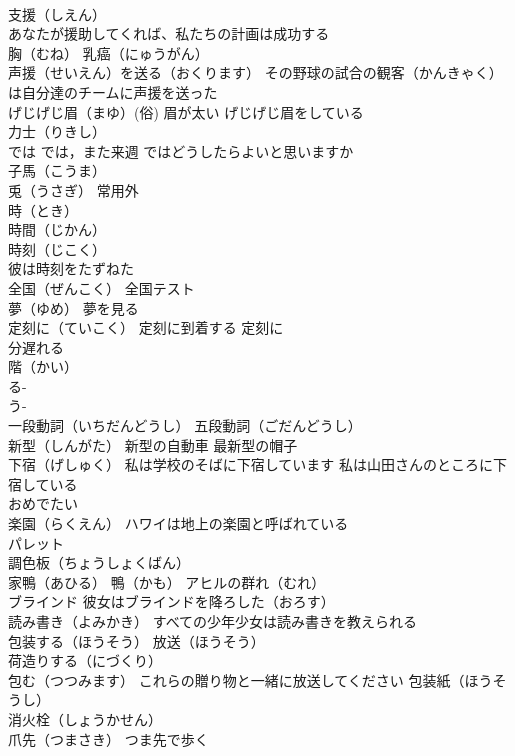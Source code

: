 \documentclass[8pt]{extreport}
\begin{document}
\begin{CJK}{UTF8}{min}
\\	支援（しえん）
\\	あなたが援助してくれば、私たちの計画は成功する
\\	胸（むね） 乳癌（にゅうがん）
\\	声援（せいえん）を送る（おくります） その野球の試合の観客（かんきゃく）は自分達のチームに声援を送った
\\	げじげじ眉（まゆ）(俗) 眉が太い げじげじ眉をしている
\\	力士（りきし）
\\	では では，また来週 ではどうしたらよいと思いますか
\\	子馬（こうま）
\\	兎（うさぎ） 常用外
\\	時（とき）
\\	時間（じかん）
\\	時刻（じこく）
\\	彼は時刻をたずねた
\\	全国（ぜんこく） 全国テスト
\\	夢（ゆめ） 夢を見る
\\	定刻に（ていこく） 定刻に到着する 定刻に 
\\	分遅れる
\\	階（かい）
\\	る-
\\	う-
\\	一段動詞（いちだんどうし） 五段動詞（ごだんどうし）
\\	新型（しんがた） 新型の自動車 最新型の帽子
\\	下宿（げしゅく） 私は学校のそばに下宿しています 私は山田さんのところに下宿している
\\	おめでたい
\\	楽園（らくえん） ハワイは地上の楽園と呼ばれている
\\	パレット 
\\	調色板（ちょうしょくばん）
\\	家鴨（あひる） 鴨（かも） アヒルの群れ（むれ）
\\	ブラインド 彼女はブラインドを降ろした（おろす）
\\	読み書き（よみかき） すべての少年少女は読み書きを教えられる
\\	包装する（ほうそう） 放送（ほうそう）
\\	荷造りする（にづくり）
\\	包む（つつみます） これらの贈り物と一緒に放送してください 包装紙（ほうそうし）
\\	消火栓（しょうかせん）
\\	爪先（つまさき） つま先で歩く

\end{CJK}
\end{document}
